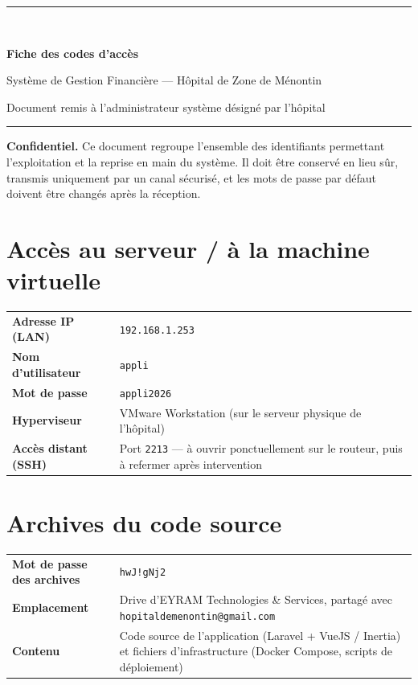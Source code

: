\documentclass[11pt,a4paper]{article}
\newcommand{\fiche}[2]{%
  \par\smallskip
  \begin{tabularx}{\textwidth}{|>{\raggedright\arraybackslash}p{5.4cm}|>{\raggedright\arraybackslash}X|}
  \hline
  \rowcolor{headbg}\multicolumn{2}{|l|}{\textbf{\textcolor{white}{#1}}}\\\hline
  #2
  \hline
  \end{tabularx}\par\smallskip
}
\newcommand{\code}[1]{\texttt{#1}}
\begin{document}
\begin{center}
{\color{primary}\rule{\textwidth}{1.6pt}}\\[0.5cm]
{\Huge\bfseries\color{darknavy} Fiche des codes d'accès\par}
\vspace{0.25cm}
{\large\color{greytext} Système de Gestion Financière — Hôpital de Zone de Ménontin\par}
\vspace{0.15cm}
{\small\color{greytext} Document remis à l'administrateur système désigné par l'hôpital\par}
{\color{primary}\rule{\textwidth}{1.6pt}}
\end{center}

\vspace{0.2cm}
\noindent\colorbox{zebra}{\parbox{\dimexpr\linewidth-2\fboxsep}{%
\small\textbf{\textcolor{danger}{Confidentiel.}} Ce document regroupe l'ensemble des identifiants permettant l'exploitation et la reprise en main du système. Il doit être conservé en lieu sûr, transmis uniquement par un canal sécurisé, et les mots de passe par défaut doivent être changés après la réception.}}

\section{Accès au serveur / à la machine virtuelle}
\fiche{Système d'exploitation (hôte / VM)}{
  \textbf{Adresse IP (LAN)} & \code{192.168.1.253} \\\hline
  \textbf{Nom d'utilisateur} & \code{appli} \\\hline
  \textbf{Mot de passe} & \code{appli2026} \\\hline
  \textbf{Hyperviseur} & VMware Workstation (sur le serveur physique de l'hôpital) \\\hline
  \textbf{Accès distant (SSH)} & Port \code{2213} — à ouvrir ponctuellement sur le routeur, puis à refermer après intervention \\
}

\section{Archives du code source}
\fiche{Fichiers archives (code \& configuration)}{
  \textbf{Mot de passe des archives} & \code{hwJ!gNj2} \\\hline
  \textbf{Emplacement} & Drive d'EYRAM Technologies \& Services, partagé avec \code{hopitaldemenontin@gmail.com} \\\hline
  \textbf{Contenu} & Code source de l'application (Laravel + VueJS / Inertia) et fichiers d'infrastructure (Docker Compose, scripts de déploiement) \\
}
\end{document}
